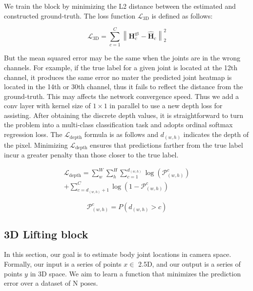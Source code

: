 \documentclass[letterpaper]{article} \usepackage{aaai21}  \usepackage{times}  \usepackage{helvet} \usepackage{courier}  \usepackage[hyphens]{url}  \usepackage{graphicx} \urlstyle{rm} \def\UrlFont{\rm}  \usepackage{natbib}  \usepackage{caption} \frenchspacing  \setlength{\pdfpagewidth}{8.5in}  \setlength{\pdfpageheight}{11in}
\begin{document}
We train the block by minimizing the L2 distance between the estimated and constructed ground-truth. The loss function $\mathcal{L}_{3\mathrm{D}}$ is defined as follows:

\begin{equation}
\mathcal{L}_{3\mathrm{D}}=\sum_{c=1}^{C}\left\|\mathbf{H}_{c}^{\mathrm{gt}}-\hat{\mathbf{H}}_{c}\right\|_{2}^{2}
\end{equation}

But the mean squared error may be the same when the joints are in the wrong channels. For example, if the true label for a given joint is located at the 12th channel, it produces the same error no mater the predicted joint heatmap is located in the 14th or 30th channel, thus it fails to reflect the distance from the ground-truth. This may affects the network convergence speed. Thus we add a conv layer with kernel size of $1\times1$ in parallel to use a new depth loss for assisting. After obtaining the discrete depth values, it is straightforward to turn the problem into a multi-class classification task and adopts ordinal softmax regression loss. The $\mathcal{L}_{\mathrm{depth}}$ formula is as follows and $d_(w, h)$ indicates the depth of the pixel. Minimizing $\mathcal{L}_{\mathrm{depth}}$ ensures that predictions farther from the true label incur a greater penalty than those closer to the true label. 


\begin{equation}
\begin{aligned}
\mathcal{L}_{\mathrm{depth}}=\sum_{w}^{W} \sum_{h}^{H} \sum_{c=1}^{d_{(w, h)}} \log \left(\mathcal{P}_{(w, h)}^{c}\right)\\ 
+\sum_{c=d_{(w, h)}+1}^{C}\log\left(1-\mathcal{P}_{(w, h)}^{c}\right)
\end{aligned}
\end{equation}



\begin{equation}
\mathcal{P}_{(w, h)}^{c}=P\left(d_{(w, h)}>c \right)
\end{equation}


\subsection{3D Lifting block}
\label{sec4}
In this section, our goal is to estimate body joint locations in camera space. Formally, our input is a series of points $x \in$ 2.5D, and our output is a series of points $y$ in 3D space. We aim to learn a function that minimizes the prediction error over a dataset of N poses.
\end{document}
